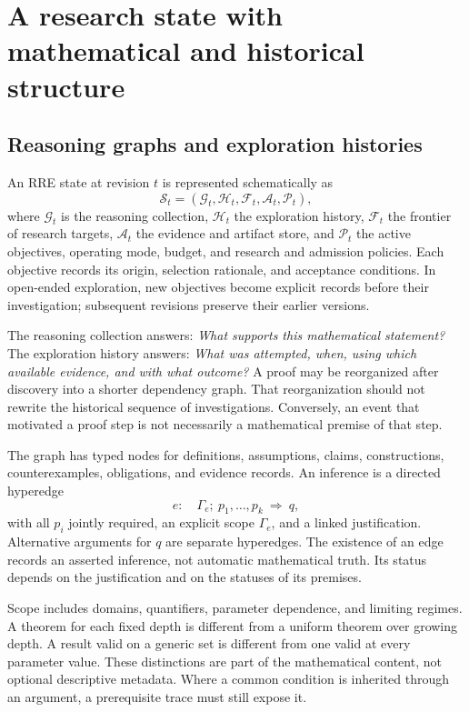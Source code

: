 \section{A research state with mathematical and historical structure}\label{sec:representation}

\subsection{Reasoning graphs and exploration histories}

An RRE state at revision $t$ is represented schematically as
\[
  \mathcal S_t=(\mathcal G_t,\mathcal H_t,\mathcal F_t,\mathcal A_t,\mathcal P_t),
\]
where $\mathcal G_t$ is the reasoning collection, $\mathcal H_t$ the exploration history, $\mathcal F_t$ the frontier of research targets, $\mathcal A_t$ the evidence and artifact store, and $\mathcal P_t$ the active objectives, operating mode, budget, and research and admission policies. Each objective records its origin, selection rationale, and acceptance conditions. In open-ended exploration, new objectives become explicit records before their investigation; subsequent revisions preserve their earlier versions.

The reasoning collection answers: \emph{What supports this mathematical statement?} The exploration history answers: \emph{What was attempted, when, using which available evidence, and with what outcome?} A proof may be reorganized after discovery into a shorter dependency graph. That reorganization should not rewrite the historical sequence of investigations. Conversely, an event that motivated a proof step is not necessarily a mathematical premise of that step.

The graph has typed nodes for definitions, assumptions, claims, constructions, counterexamples, obligations, and evidence records. An inference is a directed hyperedge
\begin{equation}\label{eq:hyperedge}
 e:\quad \Gamma_e;\ p_1,\ldots,p_k\ \Longrightarrow\ q,
\end{equation}
with all $p_i$ jointly required, an explicit scope $\Gamma_e$, and a linked justification. Alternative arguments for $q$ are separate hyperedges. The existence of an edge records an asserted inference, not automatic mathematical truth. Its status depends on the justification and on the statuses of its premises.

Scope includes domains, quantifiers, parameter dependence, and limiting regimes. A theorem for each fixed depth is different from a uniform theorem over growing depth. A result valid on a generic set is different from one valid at every parameter value. These distinctions are part of the mathematical content, not optional descriptive metadata. Where a common condition is inherited through an argument, a prerequisite trace must still expose it.

